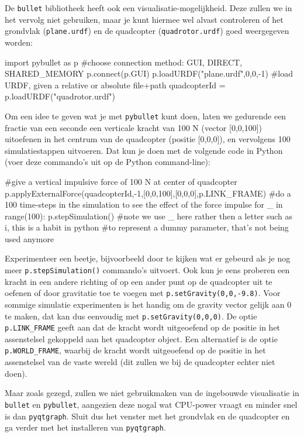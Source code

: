 \documentclass[a4paper,11pt]{article}
\begin{document}
De \texttt{bullet} bibliotheek heeft ook een visualisatie-mogelijkheid. Deze
zullen we in het vervolg niet gebruiken, maar je kunt hiermee wel alvast
controleren of het grondvlak (\texttt{plane.urdf}) en de quadcopter
(\texttt{quadrotor.urdf}) goed weergegeven worden:
\begin{pyconsole}
import pybullet as p
#choose connection method: GUI, DIRECT, SHARED_MEMORY
p.connect(p.GUI)
p.loadURDF("plane.urdf",0,0,-1)
#load URDF, given a relative or absolute file+path
quadcopterId = p.loadURDF("quadrotor.urdf")

\end{pyconsole}
Om een idee te geven wat je met \texttt{pybullet} kunt doen, laten we gedurende
een fractie van een seconde een verticale kracht van 100 N (vector [0,0,100]) uitoefenen in het
centrum van de quadcopter (positie [0,0,0]), en vervolgens 100 simulatiestappen uitvoeren. Dat
kun je doen met de volgende code in Python (voer deze commando's uit op de
Python command-line): 
\begin{pyconsole}
#give a vertical impulsive force of 100 N at center of quadcopter
p.applyExternalForce(quadcopterId,-1,[0,0,100],[0,0,0],p.LINK_FRAME)
#do a 100 time-steps in the simulation to see the effect of the force impulse 
for _ in range(100): p.stepSimulation()
#note we use _ here rather then a letter such as i, this is a habit in python
#to represent a dummy parameter, that's not being used anymore

\end{pyconsole}
Experimenteer een beetje, bijvoorbeeld door te kijken wat er gebeurd
als je nog meer \texttt{p.stepSimulation()} commando's uitvoert. Ook kun
je eens proberen een kracht in een andere richting of op een ander punt op de
quadcopter uit te oefenen of door gravitatie toe te voegen met \sloppy 
\texttt{p.setGravity(0,0,-9.8)}. Voor sommige simulatie experimenten is het
handig om de gravity vector gelijk aan 0 te maken, dat kan dus eenvoudig met
\texttt{p.setGravity(0,0,0)}. De optie \texttt{p.LINK\_FRAME} geeft aan dat de
kracht wordt uitgeoefend op de positie in het assenstelsel gekoppeld aan het
quadcopter object. Een alternatief is de optie \texttt{p.WORLD\_FRAME}, waarbij
de kracht wordt uitgeoefend op de positie in het assenstelsel van de vaste
wereld (dit zullen we bij de quadcopter echter niet doen).

Maar zoals gezegd, zullen we niet gebruikmaken van de ingebouwde visualisatie
in \texttt{bullet} en \texttt{pybullet}, aangezien deze nogal wat CPU-power
vraagt en minder snel is dan \texttt{pyqtgraph}. Sluit dus het venster met het
grondvlak en de quadcopter en ga verder met het installeren van
\texttt{pyqtgraph}.
\end{document}
